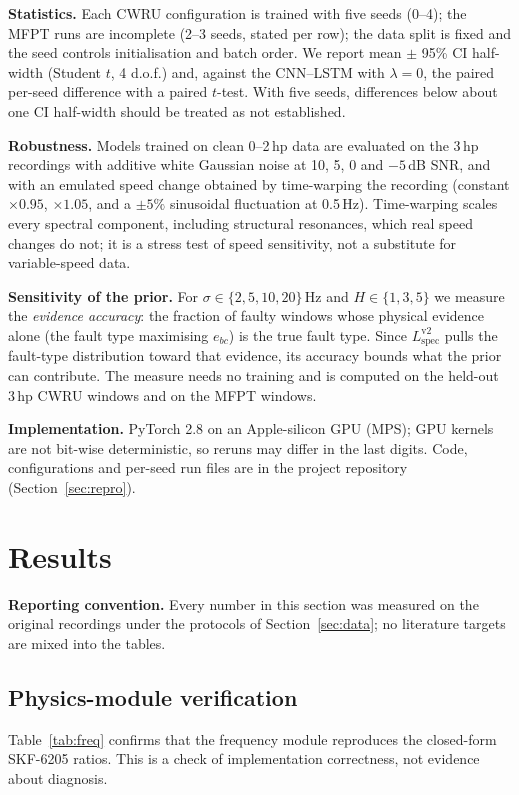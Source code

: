 \documentclass[conference]{IEEEtran}
\newcommand{\Lspec}{L_{\mathrm{spec}}}
\begin{document}
\textbf{Statistics.} Each CWRU configuration is trained with five seeds (0--4);
the MFPT runs are incomplete (2--3 seeds, stated per row);
the data split is fixed and the seed controls initialisation and batch order.
We report mean $\pm$ 95\% CI half-width (Student $t$, 4 d.o.f.) and, against the
CNN--LSTM with $\lambda=0$, the paired per-seed difference with a paired
$t$-test. With five seeds, differences below about one CI half-width should be
treated as not established.

\textbf{Robustness.} Models trained on clean 0--2\,hp data are evaluated on
the 3\,hp recordings with additive white Gaussian noise at 10, 5, 0 and
$-5$\,dB SNR, and with an emulated speed change obtained by time-warping the
recording (constant $\times0.95$, $\times1.05$, and a $\pm5\%$ sinusoidal
fluctuation at 0.5\,Hz). Time-warping scales every spectral component,
including structural resonances, which real speed changes do not; it is a
stress test of speed sensitivity, not a substitute for variable-speed data.

\textbf{Sensitivity of the prior.} For $\sigma\in\{2,5,10,20\}$\,Hz and
$H\in\{1,3,5\}$ we measure the \emph{evidence accuracy}: the fraction of
faulty windows whose physical evidence alone (the fault type maximising
$e_{bc}$) is the true fault type. Since $\Lspec^{\mathrm{v2}}$ pulls the
fault-type distribution toward that evidence, its accuracy bounds what the
prior can contribute. The measure needs no training and is computed on the
held-out 3\,hp CWRU windows and on the MFPT windows.

\textbf{Implementation.} PyTorch 2.8 on an Apple-silicon GPU (MPS); GPU
kernels are not bit-wise deterministic, so reruns may differ in the last
digits. Code, configurations and per-seed run files are in the project
repository (Section~\ref{sec:repro}).

\section{Results}
\label{sec:results}
\textbf{Reporting convention.} Every number in this section was measured on the
original recordings under the protocols of Section~\ref{sec:data}; no
literature targets are mixed into the tables.

\subsection{Physics-module verification}
Table~\ref{tab:freq} confirms that the frequency module reproduces the
closed-form SKF-6205 ratios. This is a check of implementation correctness, not
evidence about diagnosis.
\end{document}
